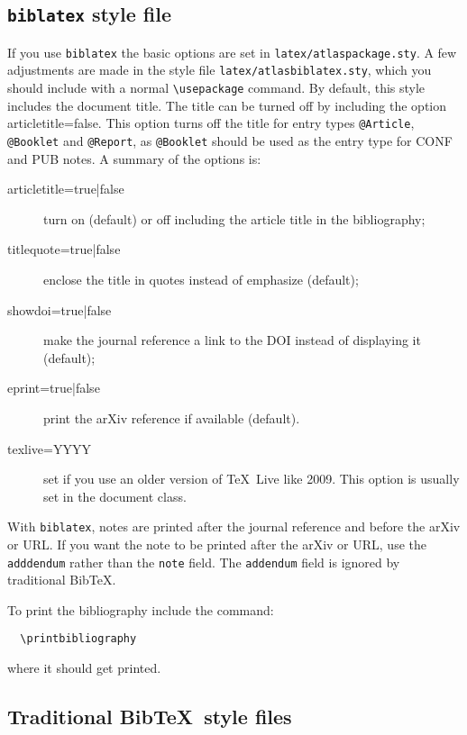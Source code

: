\documentclass[UKenglish,texlive=2013]{latex/atlasdoc}
\newcommand*{\BibTeX}{Bib\TeX}
\newcommand{\Macro}[1]{\texttt{\textbackslash #1}\xspace}
\newcommand{\Option}[1]{\textsf{#1}\xspace}
\newcommand{\Package}[1]{\texttt{#1}\xspace}
\begin{document}
\subsection{\Package{biblatex} style file}

If you use \Package{biblatex} the basic options are set in \Package{latex/atlaspackage.sty}.
A few adjustments are made in the style file \Package{latex/atlasbiblatex.sty},
which you should include with a normal \Macro{usepackage} command.
By default, this style includes the document title.
The title can be turned off by including the option \Option{articletitle=false}.
This option turns off the title for entry types \texttt{@Article}, \texttt{@Booklet} and \texttt{@Report},
as \texttt{@Booklet} should be used as the entry type for CONF and PUB notes.
A summary of the options is:
\begin{description}
\item[\Option{articletitle=true|false}] turn on (default) or off including the article title in the bibliography;
\item[\Option{titlequote=true|false}] enclose the title in quotes instead of emphasize (default);
\item[\Option{showdoi=true|false}] make the journal reference a link to the DOI instead of displaying it (default);
\item[\Option{eprint=true|false}] print the arXiv reference if available (default).
\item[\Option{texlive=YYYY}] set if you use an older version of \TeX\ Live like 2009.
  This option is usually set in the document class.
\end{description}

With \Package{biblatex}, notes are printed after the journal reference and before the arXiv or URL.
If you want the note to be printed after the arXiv or URL, use the \texttt{adddendum} rather than the \texttt{note} field.
The \texttt{addendum} field is ignored by traditional \BibTeX.

To print the bibliography include the command:
%
\begin{verbatim}
  \printbibliography
\end{verbatim}
%
where it should get printed.


\subsection{Traditional \BibTeX\ style files}
\end{document}
